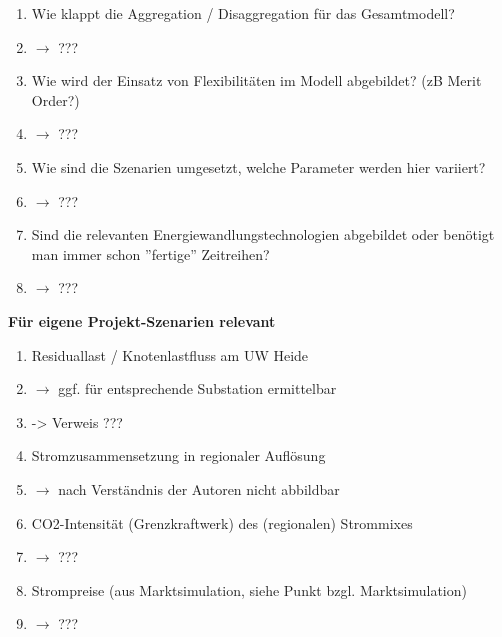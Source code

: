 \documentclass[
a4paper,     %
12pt         %
]{scrartcl}  %
\begin{document}
\begin{enumerate}
	\item Wie klappt die Aggregation / Disaggregation für das Gesamtmodell?
	\item[] $\rightarrow$ ???
	\item Wie wird der Einsatz von Flexibilitäten im Modell abgebildet? (zB Merit Order?)
	\item[] $\rightarrow$ ???
	\item Wie sind die Szenarien umgesetzt, welche Parameter werden hier variiert?
	\item[] $\rightarrow$ ???
	\item Sind die relevanten Energiewandlungstechnologien abgebildet oder benötigt man immer schon ''fertige'' Zeitreihen?
	\item[] $\rightarrow$ ???
\end{enumerate}


\textbf{Für eigene Projekt-Szenarien relevant}
\begin{enumerate}
	\item Residuallast / Knotenlastfluss am UW Heide
	\item[] $\rightarrow$ ggf. für entsprechende Substation ermittelbar
	\item[] -> Verweis ???

	\item Stromzusammensetzung in regionaler Auflösung
	\item[] $\rightarrow$ nach Verständnis der Autoren nicht abbildbar
	\item  CO2-Intensität (Grenzkraftwerk) des (regionalen) Strommixes
	\item[] $\rightarrow$ ???
	\item Strompreise (aus Marktsimulation, siehe Punkt bzgl. Marktsimulation)
	\item[] $\rightarrow$ ???
	
	
\end{enumerate}


\end{document}
